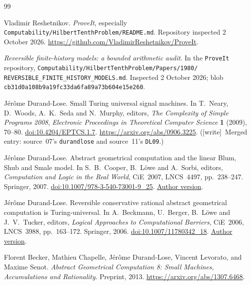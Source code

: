 \documentclass[11pt,letterpaper]{article}
\numberwithin{equation}{section}
\theoremstyle{definition}
\theoremstyle{remark}
\newcommand{\wtag}{\textup{[write]}}
\begin{document}
\clearpage
{}
\begin{thebibliography}{99}
\RaggedRight

Vladimir Reshetnikov.
\emph{ProveIt}, especially
\texttt{Computability/HilbertTenthProblem/README.md}.
Repository inspected 2 October 2026.
\url{https://github.com/VladimirReshetnikov/ProveIt}.

\emph{Reversible finite-history models: a bounded arithmetic audit}.
In the \texttt{ProveIt} repository,
\texttt{Computability/HilbertTenthProblem/Papers/1980/}
\texttt{REVERSIBLE\_FINITE\_HISTORY\_MODELS.md}.
Inspected 2 October 2026; blob
\texttt{cb31d0a108b9a19fc33da6fa89a73b604e15e260}.

J\'er\^ome Durand-Lose.
Small Turing universal signal machines.
In T.~Neary, D.~Woods, A.~K.~Seda and N.~Murphy, editors,
\emph{The Complexity of Simple Programs 2008},
\emph{Electronic Proceedings in Theoretical Computer Science}
\textbf{1} (2009), 70--80.
\href{https://doi.org/10.4204/EPTCS.1.7}{doi:10.4204/EPTCS.1.7}.
\url{https://arxiv.org/abs/0906.3225}.
(\wtag\ Merged entry: source~07's \texttt{durandlose} and source~11's \texttt{DL09}.)

J\'er\^ome Durand-Lose.
\newblock Abstract geometrical computation and the linear Blum, Shub and Smale model.
\newblock In S.~B.~Cooper, B.~L\"owe and A.~Sorbi, editors,
\emph{Computation and Logic in the Real World}, CiE~2007, LNCS~4497,
pp.~238--247. Springer, 2007.
\newblock \href{https://doi.org/10.1007/978-3-540-73001-9_25}{doi:10.1007/978-3-540-73001-9\_25}.
\href{https://www.univ-orleans.fr/lifo/membres/Jerome.Durand-Lose/Recherche/Publications/2007_CiE.pdf}{Author version}.

J\'er\^ome Durand-Lose.
\newblock Reversible conservative rational abstract geometrical computation is Turing-universal.
\newblock In A.~Beckmann, U.~Berger, B.~L\"owe and J.~V.~Tucker, editors,
\emph{Logical Approaches to Computational Barriers}, CiE~2006, LNCS~3988,
pp.~163--172. Springer, 2006.
\newblock \href{https://doi.org/10.1007/11780342_18}{doi:10.1007/11780342\_18}.
\href{https://www.univ-orleans.fr/lifo/membres/Jerome.Durand-Lose/Recherche/Publications/2006_CiE.pdf}{Author version}.

Florent Becker, Mathieu Chapelle, J\'er\^ome Durand-Lose,
Vincent Levorato, and Maxime Senot.
\emph{Abstract Geometrical Computation 8: Small Machines,
Accumulations and Rationality}.
Preprint, 2013.
\url{https://arxiv.org/abs/1307.6468}.


\end{thebibliography}
\end{document}

